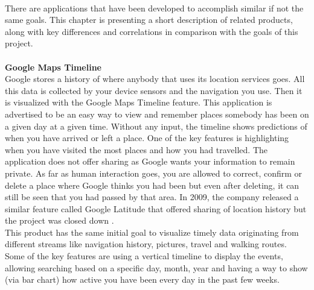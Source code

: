 \documentclass{l4proj}
\begin{document}
\paragraph{}
There are applications that have been developed to accomplish similar if not the same goals. This chapter is presenting a short description of related products, along with key differences and correlations in comparison with the goals of this project.   
\paragraph{}
\textbf{Google Maps Timeline} \\
Google stores a history of where anybody that uses its location services goes. All this data is collected by your device sensors and the navigation you use. Then it is visualized with the Google Maps Timeline \cite{GoogleMapsTimeline} feature. This application is advertised to be an easy way to view and remember places somebody has been on a given day at a given time. Without any input, the timeline shows predictions of when you have arrived or left a place. One of the key features is highlighting when you have visited the most places and how you had travelled. The application does not offer sharing as Google wants your information to remain private. As far as human interaction goes, you are allowed to correct, confirm or delete a place where Google thinks you had been but even after deleting,  it can still be seen that you had passed by that area. In 2009, the company released a similar feature called Google Latitude that offered sharing of location history but the project was closed down \cite{GMTimeFeature}.
\\
This product has the same initial goal to visualize timely data originating from different streams like navigation history, pictures, travel and walking routes. Some of the key features are using a vertical timeline to display the events, allowing searching based on a specific day, month, year and having a way to show (via bar chart) how active you have been every day in the past few weeks. 
\end{document}
